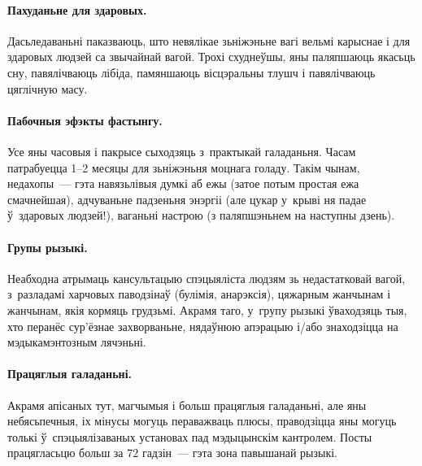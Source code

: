 \paragraph{Пахуданьне для здаровых.}
Дасьледаваньні паказваюць, што невялікае зьніжэньне вагі вельмі карыснае і для здаровых людзей са звычайнай вагой. Трохі схуднеўшы, яны паляпшаюць якасьць сну, павялічваюць лібіда, памяншаюць вісцэральны тлушч і павялічваюць цяглічную масу.

\paragraph{Пабочныя эфэкты фастынгу.}
Усе яны часовыя і пакрысе сыходзяць з~практыкай галаданьня. Часам патрабуецца 1--2 месяцы для зьніжэньня моцнага голаду. Такім чынам, недахопы~--- гэта навязьлівыя думкі аб ежы (затое потым простая ежа смачнейшая), адчуваньне падзеньня энэргіі (але цукар у~крыві ня падае ў~здаровых людзей!), ваганьні настрою (з паляпшэньнем на наступны дзень).

\paragraph{Групы рызыкі.}
Неабходна атрымаць кансультацыю спэцыяліста людзям зь недастатковай вагой, з~разладамі харчовых паводзінаў (булімія, анарэксія), цяжарным жанчынам і жанчынам, якія кормяць грудзьмі. Акрамя таго, у~групу рызыкі ўваходзяць тыя, хто перанёс сур'ёзнае захворваньне, нядаўнюю апэрацыю і/або знаходзіцца на мэдыкамэнтозным лячэньні.


\paragraph{Працяглыя галаданьні.}
Акрамя апісаных тут, магчымыя і больш працяглыя галаданьні, але яны небясьпечныя, іх мінусы могуць пераважваць плюсы, праводзіцца яны могуць толькі ў~спэцыялізаваных установах пад мэдыцынскім кантролем. Посты працягласьцю больш за 72 гадзін~--- гэта зона павышанай рызыкі.